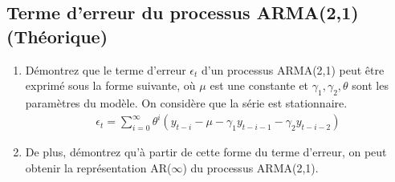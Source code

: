 \documentclass[11pt,english,francais]{article}
\begin{document}
\subsection{Terme d'erreur du processus ARMA(2,1) (Théorique)}

\begin{enumerate}
\item Démontrez que le terme d'erreur $\epsilon_t$ d'un processus ARMA(2,1) peut être exprimé sous la forme suivante, où $\mu$ est une constante et $\gamma_1, \gamma_2, \theta$ sont les paramètres du modèle. On considère que la série est stationnaire.
\begin{align*}
  \epsilon_t = \sum_{i=0}^{\infty} \theta^i \left(y_{t-i} - \mu - \gamma_1 y_{t-i-1} - \gamma_2 y_{t-i-2} \right)
\end{align*}

\item De plus, démontrez qu'à partir de cette forme du terme d'erreur, on peut obtenir la représentation AR($\infty$) du processus ARMA(2,1).
\end{enumerate}

\clearpage


\end{document}
